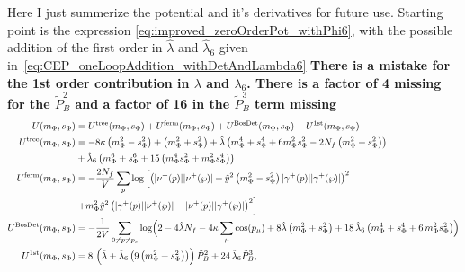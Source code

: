 \label{ch:potAndDerivatives}
Here I just summerize the potential and it's derivatives for future use. Starting point is the expression \eqref{eq:improved_zeroOrderPot_withPhi6},
with the possible addition of the first order in $\hat\lambda$ and $\hat\lambda_6$ given in~\eqref{eq:CEP_oneLoopAddition_withDetAndLambda6}
\textbf{There is a mistake for the 1st order contribution in $\lambda$ and $\lambda_6$. There is a factor of 4 missing for the $\tilde P_B^2$ and a factor of 16 in the 
$\tilde P_B^3$ term missing}
\begin{align}\label{eq:CEP_shortCut}
 U(m_{\Phi}, s_{\Phi}) &= U^{\text{tree}}(m_{\Phi}, s_{\Phi}) + U^{\text{ferm}}(m_{\Phi}, s_{\Phi})
                          + U^{\text{BosDet}}(m_{\Phi}, s_{\Phi}) + U^{\text{1st}}(m_{\Phi}, s_{\Phi})
              \\ \label{CEP_treeLevel}
 U^{\text{tree}}(m_{\Phi}, s_{\Phi}) &= -8 \kappa \left( m_{\Phi}^2 - s_{\Phi}^2 \right)   +   \left( m_{\Phi}^2 + s_{\Phi}^2 \right)
                         + \hat\lambda \left( m_{\Phi}^4 + s_{\Phi}^4 + 6 m_{\Phi}^2 s_{\Phi}^2 - 2 N_f \left(m_{\Phi}^2 + s_{\Phi}^2 \right) \right) 
              \nonumber \\
                         & + \hat\lambda_6 \left( m_{\Phi}^6 + s_{\Phi}^6 + 15 \left( m_{\Phi}^4 s_{\Phi}^2 + m_{\Phi}^2 s_{\Phi}^4 \right)   \right)
              \\ \label{eq:CEP_ferionicContribution}
 U^{\text{ferm}}(m_{\Phi}, s_{\Phi}) &= -\frac{2N_f}{V} \sum\limits_p \log
                                    \left[ \left( |\nu^+(p)| |\nu^+(\wp)|   +
                                    \hat y ^2 \left( m_{\Phi}^2 - s_{\Phi}^2 \right) |\gamma^+(p)| |\gamma^+(\wp)|\right)^2 
                                              \nonumber \right. \\ 
                        & \left. +  m_{\Phi}^2 \hat y^2 \left( |\gamma^+(p)| |\nu^+(\wp)|   -   |\nu^+(p)| |\gamma^+(\wp)| \right)^2\right] 
                                              \\ \label{eq:CEP_bosonicDeterminantContribution}
 U^{\text{BosDet}}(m_{\Phi}, s_{\Phi}) &= - \frac{1}{2V}\sum\limits_{0 \neq p \neq p_s} 
                        \log\Bigl( 2 - 4 \hat\lambda N_f - 4 \kappa \sum_{\mu} \cos(p_{\mu}) + 8 \hat\lambda \left( m_{\Phi}^2 + s_{\Phi}^2  \right) 
                        + 18\, \hat\lambda_6\left( m_{\Phi}^4 + s_{\Phi}^4 + 6\,  m_{\Phi}^2 s_{\Phi}^2 \right)\Bigr)
                                              \\ \label{eq:CEP_bosonicFirstOrderContribution}
 U^{\text{1st}}(m_{\Phi}, s_{\Phi}) & = 8\,\left(\hat \lambda + \hat\lambda_6\left( 9\left( m_{\Phi}^2 + s_{\Phi}^2 \right) \right) \right) \tilde P_B^2
                        + 24\, \hat\lambda_6 \tilde P_B^3,
\end{align}
% 
% 
